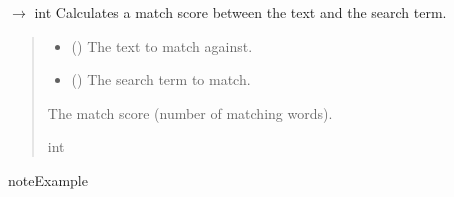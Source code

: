 \documentclass[letterpaper,10pt,english]{sphinxmanual}
\begin{document}
\begin{fulllineitems}
\begin{fulllineitems}
\end{fulllineitems}


\begin{fulllineitems}
\label{\detokenize{src.esg_reports:src.esg_reports.search.Search._match_score}}
\pysigstartsignatures
\pysiglinewithargsret
{}
{\sphinxparamcomma {}}
{{ $\rightarrow$ int}}
\pysigstopsignatures
\sphinxAtStartPar
Calculates a match score between the text and the search term.
\begin{quote}\begin{description}
\begin{itemize}
\item {} 
\sphinxAtStartPar
{} () \textendash{} The text to match against.

\item {} 
\sphinxAtStartPar
{} () \textendash{} The search term to match.

\end{itemize}

\sphinxAtStartPar
The match score (number of matching words).

\sphinxAtStartPar
int

\end{description}\end{quote}

\begin{sphinxadmonition}{note}{Example}

\begin{sphinxVerbatim}[commandchars=\\\{\}]
   
   
\end{sphinxVerbatim}
\end{sphinxadmonition}


\end{fulllineitems}
\end{fulllineitems}
\end{document}
